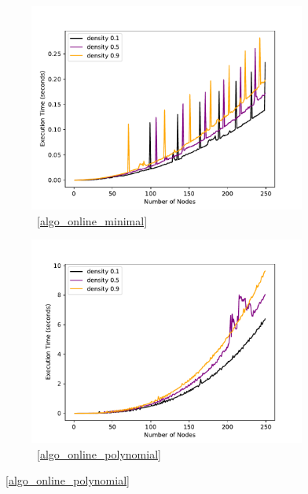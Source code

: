 \documentclass[sigplan]{acmart}
\begin{document}
\begin{figure}
    \begin{subfigure}{\linewidth}
      \includegraphics[width=\linewidth]{timeVsSize_10_OptimalSet.pdf}
      \caption{~\ref{algo_online_minimal}}
      \label{fig:sfigOptimalTvsS}
    \end{subfigure}

    \begin{subfigure}{\linewidth}
      \includegraphics[width=\linewidth]{timeVsSize_10_Polynomial.pdf}
      \caption{~\ref{algo_online_polynomial}}
      \label{fig:sfigPolynomialTvsS}
    \end{subfigure}
    

\end{figure}
\end{document}
